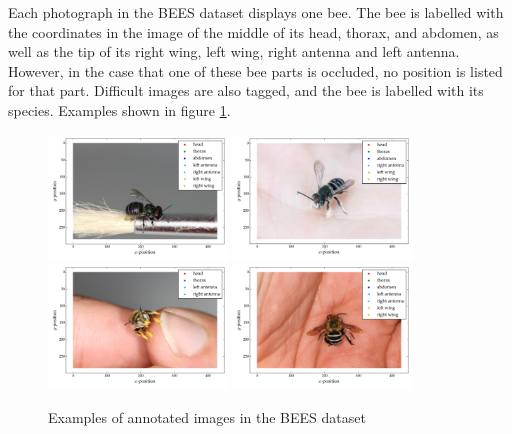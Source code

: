 \documentclass[11pt, oneside]{report}
\begin{document}
    Each photograph in the BEES dataset displays one bee. The bee is labelled with the coordinates in the image of the middle of its head, thorax, and abdomen, as well as the tip of its right wing, left wing, right antenna and left antenna. However, in the case that one of these bee parts is occluded, no position is listed for that part. Difficult images are also tagged, and the bee is labelled with its species. Examples shown in figure \ref{fig:BEES_examples}.

\begin{figure}[h]
    \centering
    \includegraphics[width=0.424\textwidth]{b1.pdf}\hfill
    \includegraphics[width=0.424\textwidth]{b2.pdf}
    \includegraphics[width=0.424\textwidth]{b3.pdf}\hfill
    \includegraphics[width=0.424\textwidth]{b4.pdf}
    \caption{Examples of annotated images in the BEES dataset}
    \label{fig:BEES_examples}
\end{figure}
\end{document}
